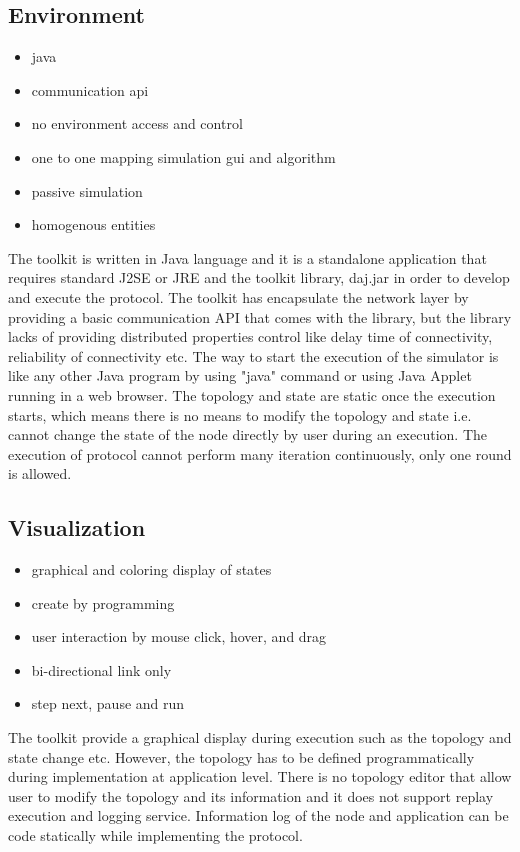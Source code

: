 \subsection*{Environment}
\begin{itemize}
\item java
\item communication api
\item no environment access and control
\item one to one mapping simulation gui and algorithm
\item passive simulation
\item homogenous entities
\end{itemize}


The toolkit is written in Java language and it is a standalone application that requires standard J2SE or JRE and the toolkit library, daj.jar in order to develop and execute the protocol. The toolkit has encapsulate the network layer by providing a basic communication API that comes with the library, but the library lacks of providing distributed properties control like delay time of connectivity, reliability of connectivity etc. The way to start the execution of the simulator is like any other Java program by using "java" command or using Java Applet running in a web browser. The topology and state are static once the execution starts, which means there is no means to modify the topology and state i.e. cannot change the state of the node directly by user during an execution. The execution of protocol cannot perform many iteration continuously, only one round is allowed.

\subsection*{Visualization}
\begin{itemize}
\item graphical and coloring display of states
\item create by programming
\item user interaction by mouse click, hover, and drag
\item bi-directional link only
\item step next, pause and run
\end{itemize}

The toolkit provide a graphical display during execution such as the topology and state change etc. However, the topology has to be defined programmatically during implementation at application level. There is no topology editor that allow user to modify the topology and its information and it does not support replay execution and logging service. Information log of the node and application can be code statically while implementing the protocol.

